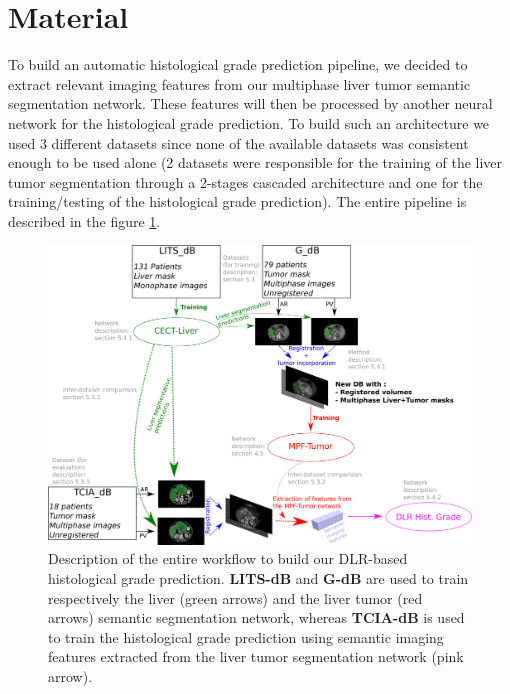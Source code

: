\documentclass[]{article}
\newcommand{\lmttfont}[1]{{\fontfamily{lmtt}\selectfont #1}}
\begin{document}
\section{Material}


To build an automatic histological grade prediction pipeline, we decided to extract relevant imaging features from our multiphase liver tumor semantic segmentation network. These features will then be processed by another neural network for the histological grade prediction. To build such an architecture we used 3 different datasets since none of the available datasets was consistent enough to be used alone (2 datasets were responsible for the training of the liver tumor segmentation through a 2-stages cascaded architecture and one for the training/testing of the histological grade prediction). The entire pipeline is described in the figure \ref{fig:DLR_pipeline_withDB}.
\begin{figure}[ht!]
	\centering
	\includegraphics[width=0.9\linewidth]{../HistologicalGradePrediction/images/DLR_pipeline_withDB}
	\caption{Description of the entire workflow to build our DLR-based histological grade prediction. \textbf{\lmttfont{LITS-dB}} and \textbf{\lmttfont{G-dB}} are used to train respectively the liver (green arrows) and the liver tumor (red arrows) semantic segmentation network, whereas \textbf{\lmttfont{TCIA-dB}} is used to train the histological grade prediction using semantic imaging features extracted from the liver tumor segmentation network (pink arrow).}
	\label{fig:DLR_pipeline_withDB}
\end{figure}
\end{document}
